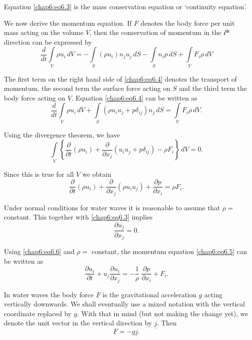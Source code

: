 Equation \eqref{chap6:eq6.3} is the mass conservation equation or `continuity equation'.

We now derive the momentum equation. If $F$ denotes the body force per unit mass acting on the volume $V$, then the conservation of momentum in the $i^{\rm th}$ direction can be expressed by
\begin{equation}
\frac{d}{dt}\int\limits_V\rho u_i\,dV= -\int\limits_S\left(\rho u_i\right)n_ju_j\,dS-\int\limits_Sn_ip\,dS+\int\limits_V F_i\rho \,dV\tag{6.4}\label{chap6:eq6.4}
\end{equation}

The first term on the right hand side of \eqref{chap6:eq6.4} denotes the transport of momentum, the second term the surface force acting on $S$ and the third term the body force acting on $V$. Equation \eqref{chap6:eq6.4} can be written as 
$$
\frac{d}{dt}\int\limits_V\rho u_i\,dV+\int\limits_S\left(\rho u_iu_j+p\delta_{ij} \right)n_j\,dS=\int\limits_V F_i\rho \,dV.
$$

Using the divergence theorem, we have 
$$
\int\limits_V\left\{\frac{\partial}{\partial t}\left(\rho u_i\right)+\frac{\partial}{\partial x_j}\left(u_iu_j+p\delta_{ij}\right)-\rho F_i\right\}\,dV=0.
$$

Since this is true for all $V$ we obtain 
\begin{equation}
\frac{\partial}{\partial t}\left(\rho u_i\right)+\frac{\partial}{\partial x_j} \left(\rho u_iu_j\right)+\frac{\partial p}{\partial x_i}=\rho F_i. \tag{6.5}\label{chap6:eq6.5}
\end{equation}

Under normal conditions for water waves it is reasonable to assume that $\rho =$ constant. This together with \eqref{chap6:eq6.3} implies 
\begin{equation}
\frac{\partial u_j}{\partial x_j}=0.\tag{6.6}\label{chap6:eq6.6}
\end{equation}\pageoriginale

Using \eqref{chap6:eq6.6} and $\rho=$ constant, the momentum equation \eqref{chap6:eq6.5} can be written as
\begin{equation}
\frac{\partial u_i}{\partial t}+u_j\frac{\partial u_i}{\partial x_j}= -\frac{1}{\rho}\;\frac{\partial p}{\partial x_i}+F_i. \tag{6.7}\label{chap6:eq6.7}
\end{equation}

In water waves the body force $\underline{F}$ is the gravitational acceleration $g$ acting vertically downwards. We shall eventually use a mixed notation with the vertical coordinate replaced by $y$. With that in mind (but not making the change yet), we denote the unit vector in the vertical direction by $\underline{j}$. Then 
\begin{equation}
\underline{F}=-g\underline{j}.\tag{6.8}\label{chap6:eq6.8}
\end{equation}

